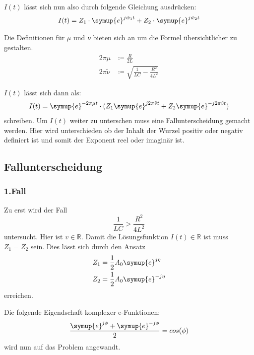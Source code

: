     \noindent $I(t)$ lässt sich nun also durch folgende Gleichung ausdrücken:
    \begin{equation}
        I(t) = Z_1 \cdot \symup{e}^{j \tilde{w}_1t} + Z_2 \cdot \symup{e}^{j\tilde{w}_2 t} \nonumber
    \end{equation}
    
    \noindent Die Definitionen für $\mu$ und $\nu$ bieten sich an um die Formel übersichtlicher zu gestalten.
    \begin{align}
        2 \pi \mu & \coloneq \frac{R}{2L} \nonumber\\ 
        2 \pi \tilde{\nu} & \coloneq \sqrt{\frac{1}{LC} - \frac{R^2}{4L^2}} \nonumber
    \end{align}

    \noindent $I(t)$ lässt sich dann als:
    \begin{equation}
        I(t) = \symup{e}^{- 2 \pi \mu t} \cdot  (Z_1 \symup{e}^{j 2\pi \tilde{v}t} + Z_2 \symup{e}^{-j 2\pi \tilde{v} t}) \nonumber
    \end{equation}
    \noindent schreiben. Um $I(t)$ weiter zu unterschen muss eine Fallunterscheidung gemacht werden. Hier wird unterschieden ob der 
    Inhalt der Wurzel positiv oder negativ definiert ist und somit der Exponent reel oder imaginär ist. 
    \subsection{Fallunterscheidung}

        \subsubsection{1.Fall}
        Zu erst wird der Fall
        \begin{equation}
            \frac{1}{LC} > \frac{R^2}{4L^2}  \nonumber
        \end{equation}
        \noindent untersucht. Hier ist $v \in \mathds{R}$. Damit die Lösungsfunktion $I(t) \in \mathds{R}$ ist muss
        $Z_1 = \overline{Z_2}$ sein. Dies lässt sich durch den Ansatz
        \begin{align}
            Z_1 & = \frac{1}{2} A_0 \symup{e}^{j \eta } \nonumber\\
            Z_2 & = \frac{1}{2} A_0 \symup{e}^{-j \eta} \nonumber
        \end{align}
        \noindent erreichen.
        
        \noindent Die folgende Eigendschaft komplexer e-Funktionen;
        \begin{equation}
            \frac{\symup{e}^{j \phi} + \symup{e}^{-j \phi}}{2} = cos(\phi) \nonumber
        \end{equation}
        \noindent wird nun auf das Problem angewandt.

